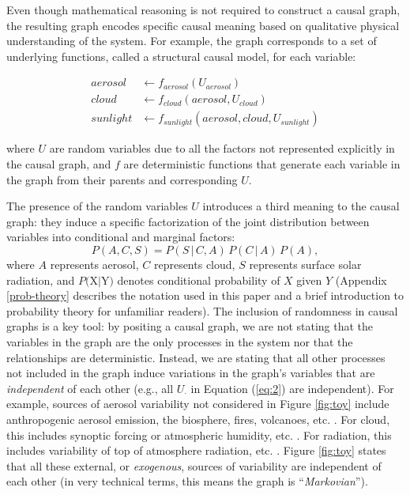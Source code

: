 \documentclass[12pt]{article}
\begin{document}
Even though mathematical reasoning is not required to construct a
causal graph, the resulting graph encodes specific causal meaning
based on qualitative physical understanding of the system. For
example, the graph corresponds to a set of underlying functions,
called a structural causal model, for each variable:

\begin{align}
  \label{eq:2}
  aerosol &\leftarrow f_{aerosol} (U_{aerosol}) \\
  cloud &\leftarrow f_{cloud} (aerosol, U_{cloud})\\
  sunlight &\leftarrow f_{sunlight} (aerosol, cloud, U_{sunlight})
\end{align}

where $U$ are random variables due to all the factors not represented
explicitly in the causal graph, and $f$ are deterministic functions
that generate each variable in the graph from their parents and
corresponding $U$.

The presence of the random variables $U$ introduces a third meaning to
the causal graph: they induce a specific factorization of the joint
distribution between variables into conditional and marginal factors:
\begin{equation}
  P(A, C, S) = P(S \, | \,C, A) \, P(C \, | \, A) \, P(A),
\end{equation}
where $A$ represents aerosol, $C$ represents cloud, $S$ represents
surface solar radiation, and $P($X$ | $Y$)$ denotes conditional
probability of $X$ given $Y$ (Appendix \ref{prob-theory} describes the notation used in
this paper and a brief introduction to probability theory for
unfamiliar readers). The inclusion of randomness in causal graphs is a
key tool: by positing a causal graph, we are not stating that the
variables in the graph are the only processes in the system nor that the relationships are deterministic. Instead,
we are stating that all other processes not included in the graph
induce variations in the graph's variables that are \emph{independent} of
each other (e.g., all $U_{\cdot}$ in Equation (\ref{eq:2}) are
independent). For example, sources of aerosol variability not
considered in Figure \ref{fig:toy} include anthropogenic aerosol
emission, the biosphere, fires, volcanoes,
etc. \citep[e.g.,][]{Boucher2015}. For cloud, this includes synoptic
forcing or atmospheric humidity,
etc. \citep[e.g.,][]{wallace2006atmospheric}. For radiation, this
includes variability of top of atmosphere radiation,
etc. \citep[e.g.,][]{hartmann2015global}. Figure \ref{fig:toy} states
that all these external, or \textit{exogenous}, sources of variability
are independent of each other (in very technical terms, this means the
graph is ``\textit{Markovian}'').
\end{document}
